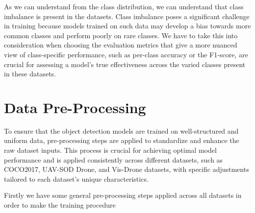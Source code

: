 As we can understand from the class distribution, we can understand that class imbalance is present in the datasets. Class imbalance poses a significant 
challenge in training because models trained on such data may develop a bias towards more common classes and perform poorly on rare classes. 
We have to take this into consideration when choosing the evaluation metrics that give a more nuanced view of class-specific performance, such as 
per-class accuracy or the F1-score, are crucial for assessing a model’s true effectiveness across the varied classes present in these datasets.



\newpage
\section{Data Pre-Processing}

To ensure that the object detection models are trained on well-structured and uniform data, pre-processing steps are applied to standardize and enhance the 
raw dataset inputs. This process is crucial for achieving optimal model performance and is applied consistently across different datasets, such as COCO2017, 
UAV-SOD Drone, and Vis-Drone datasets, with specific adjustments tailored to each dataset's unique characteristics.

Firstly we have some general pre-processing steps applied across all datasets in order to make the training procedure 

